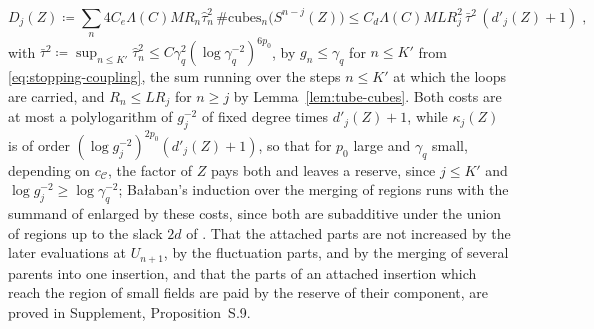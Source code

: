 \documentclass[11pt]{preprint}
\numberwithin{equation}{section}
\theoremstyle{definition}
\theoremstyle{remark}
\theoremstyle{plain}
\begin{document}
\begin{equation}\label{eq:lifetime-cost}
    D_j(Z) \coloneqq \sum_n4C_e\Lambda(C)MR_n\hat\tau_n^2\,\#\mathrm{cubes}_n\bigl(S^{n-j}(Z)\bigr) \leq C_d\Lambda(C)MLR_j^2\,\bar\tau^2\,(d'_j(Z) + 1)\;,
\end{equation}
with $\bar\tau^2 \coloneqq \sup_{n \leq K'}\hat\tau_n^2 \leq C\gamma_q^2(\log\gamma_q^{-2})^{6p_0}$, by $g_n \leq \gamma_q$ for $n \leq K'$ from \eqref{eq:stopping-coupling}, the sum running over the steps $n \leq K'$ at which the loops are carried, and $R_n \leq LR_j$ for $n \geq j$ by Lemma~\ref{lem:tube-cubes}. Both costs are at most a polylogarithm of $g_j^{-2}$ of fixed degree times $d'_j(Z) + 1$, while $\kappa_j(Z)$ is of order $(\log g_j^{-2})^{2p_0}(d'_j(Z) + 1)$, so that for $p_0$ large and $\gamma_q$ small, depending on $c_{\mathcal C}$, the factor of $Z$ pays both and leaves a reserve, since $j \leq K'$ and $\log g_j^{-2} \geq \log\gamma_q^{-2}$; Ba{\l}aban's induction over the merging of regions \cite[pp.~384--389]{BalabanLFR2} runs with the summand of \cite[(1.80)]{BalabanLFR2} enlarged by these costs, since both are subadditive under the union of regions up to the slack $2d$ of \cite[p.~386]{BalabanLFR2}. That the attached parts are not increased by the later evaluations at $U_{n+1}$, by the fluctuation parts, and by the merging of several parents into one insertion, and that the parts of an attached insertion which reach the region of small fields are paid by the reserve of their component, are proved in Supplement, Proposition~S.9.
\end{document}
